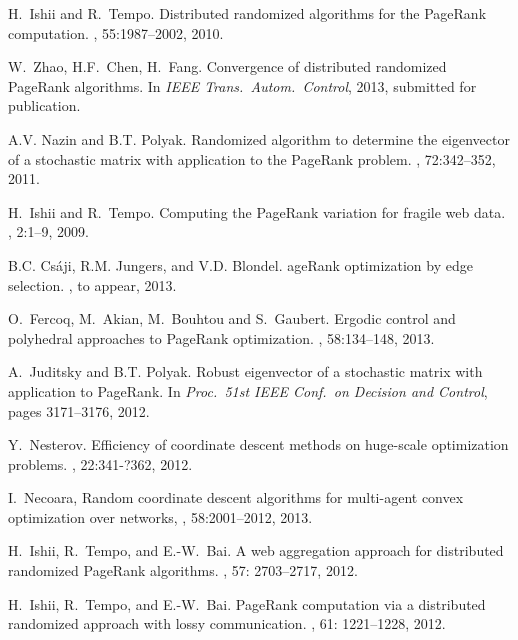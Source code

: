 \documentclass[11pt,draftcls,onecolumn]{IEEEtran}
\begin{document}
\begin{table}[t]
\begin{thebibliography}{1}
H.~Ishii and R.~Tempo.
\newblock Distributed randomized algorithms for the {P}age{R}ank computation.
, 55:1987--2002, 2010.

W.~Zhao, H.{\;}F.~Chen, H.~Fang.
\newblock Convergence of distributed randomized {P}age{R}ank algorithms.
\newblock In {\em IEEE Trans.\ Auto\-m.\ Control}, 2013, submitted for publication.

A.{\;}V. Nazin and B.{\;}T. Polyak.
\newblock Randomized algorithm to determine the eigenvector of a stochastic
  matrix with application to the {P}age{R}ank problem.
, 72:342--352, 2011.

H.~Ishii and R.~Tempo.
\newblock Computing the {P}age{R}ank variation for fragile web data.
, 2:1--9,
2009.

B.{\;}C. Cs\'{a}ji, R.{\;}M. Jungers, and V.{\;}D. Blondel.
age{R}ank optimization by edge selection.
, to appear, 2013.

O.~Fercoq, M.~Akian, M.~Bouhtou and S.~Gaubert.
\newblock Ergodic control and polyhedral approaches to PageRank optimization.
, 58:134--148, 2013.

A.~Juditsky and B.{\;}T. Polyak.
\newblock Robust eigenvector of a stochastic matrix with application to PageRank.
In {\em Proc.\ {\rm 51}st IEEE Conf.\ on Decision and Control}, 
pages 3171--3176,  2012.

Y.~Nesterov.
\newblock Efficiency of coordinate descent methods on huge-scale 
optimization problems.
, 22:341-?362, 2012.

I.~Necoara, 
\newblock Random coordinate descent algorithms for multi-agent convex 
optimization over networks,
, 58:2001--2012, 2013.



H.~Ishii, R.~Tempo, and E.-W.~Bai.
\newblock 
A web aggregation approach for distributed randomized PageRank algorithms.
, 57: 2703--2717, 2012.

H.~Ishii, R.~Tempo, and E.-W.~Bai.
\newblock 
PageRank computation via a distributed randomized approach with lossy communication.
, 61: 1221--1228, 2012. 


\end{thebibliography}
\end{table}
\end{document}
